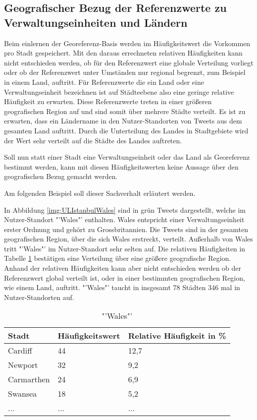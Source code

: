 		\subsection{Geografischer Bezug der Referenzwerte zu Verwaltungseinheiten und Ländern} 

			Beim einlernen der Georeferenz-Basis werden im Häufigkeitswert die Vorkommen pro Stadt gespeichert.
			Mit den daraus errechneten relativen Häufigkeiten kann nicht entschieden werden, ob für den Referenzwert eine globale Verteilung vorliegt oder ob der Referenzwert unter Umständen nur regional begrenzt, zum Beispiel in einem Land, auftritt.
			Für Referenzwerte die ein Land oder eine Verwaltungseinheit bezeichnen ist auf Städteebene also eine geringe relative Häufigkeit zu erwarten.
			Diese Referenzwerte treten in einer größeren geografischen Region auf und sind somit über mehrere Städte verteilt.
			Es ist zu erwarten, dass ein Ländername in den Nutzer-Standorten von Tweets aus dem gesamten Land auftritt.
			Durch die Unterteilung des Landes in Stadtgebiete wird der Wert sehr verteilt auf die Städte des Landes auftreten.

			Soll nun statt einer Stadt eine Verwaltungseinheit oder das Land als Georeferenz bestimmt werden, kann mit diesen Häufigkeitswerten keine Aussage über den geografischen Bezug gemacht werden. 
			
			Am folgenden Beispiel soll dieser Sachverhalt erläutert werden.

			In Abbildung \ref{img:ULIstanbulWales} sind in grün Tweets dargestellt, welche im Nutzer-Standort "'Wales"' enthalten.
			Wales entspricht einer Verwaltungseinheit erster Ordnung und gehört zu Grossbritannien.
			Die Tweets sind in der gesamten geografischen Region, über die sich Wales erstreckt, verteilt.
			Außerhalb von Wales tritt "'Wales"' im Nutzer-Standort sehr selten auf.
			Die relativen Häufigkeiten in Tabelle \ref{tab:walesCity} bestätigen eine Verteilung über eine größere geografische Region.
			Anhand der relativen Häufigkeiten kann aber nicht entschieden werden ob der Referenzwert global verteilt ist, oder in einer bestimmten geografischen Region, wie einem Land, auftritt. 
			"'Wales"' taucht in insgesamt 78 Städten 346 mal in Nutzer-Standorten auf.

			\begin{table}[h]
			\centering
			\caption{"'Wales"'}
			\label{tab:walesCity}
			\begin{tabular}{|l|l|l|}
			\hline
			Stadt      & Häufigkeitswert & Relative Häufigkeit in \% \\ \hline \hline
			Cardiff    & 44 & 12,7 \\ \hline
			Newport    & 32 & 9,2  \\ \hline
			Carmarthen & 24 & 6,9  \\ \hline
			Swansea    & 18 & 5,2  \\ \hline
			...    & ... & ...  \\ \hline
			\end{tabular}
			\end{table}

